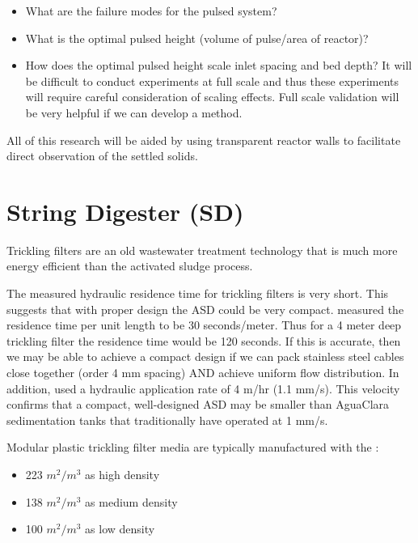 \documentclass[letterpaper,10pt,english]{sphinxmanual}
\begin{document}
\begin{description}
\begin{itemize}
\item {} 
What are the failure modes for the pulsed system?

\item {} 
What is the optimal pulsed height (volume of pulse/area of reactor)?

\item {} 
How does the optimal pulsed height scale inlet spacing and bed depth? It will be difficult to conduct experiments at full scale and thus these experiments will require careful consideration of scaling effects. Full scale validation will be very helpful if we can develop a method.

\end{itemize}

All of this research will be aided by using transparent reactor walls to facilitate direct observation of the settled solids.

\end{description}


\section{String Digester (SD)}
\label{\detokenize{WasteWater/WW_Theory_and_Future_Work:string-digester-sd}}\label{\detokenize{WasteWater/WW_Theory_and_Future_Work:heading-string-digester}}
Trickling filters are an old wastewater treatment technology that is much more energy efficient than the activated sludge process.

The measured hydraulic residence time for trickling filters is very short. This suggests that with proper design the ASD could be very compact.  measured the residence time per unit length to be 30 seconds/meter. Thus for a 4 meter deep trickling filter the residence time would be 120 seconds. If this is accurate, then we may be able to achieve a compact design if we can pack stainless steel cables close together (order 4 mm spacing) AND achieve uniform flow distribution. In addition,  used a hydraulic application rate of 4 m/hr (1.1 mm/s). This velocity confirms that a compact, well-designed ASD may be smaller than AguaClara sedimentation tanks that traditionally have operated at 1 mm/s.

Modular plastic trickling filter media are typically manufactured with the :
\begin{itemize}
\item {} 
223 \(m^2/m^3\) as high density

\item {} 
138 \(m^2/m^3\) as medium density

\item {} 
100 \(m^2/m^3\) as low density

\end{itemize}
\end{document}
